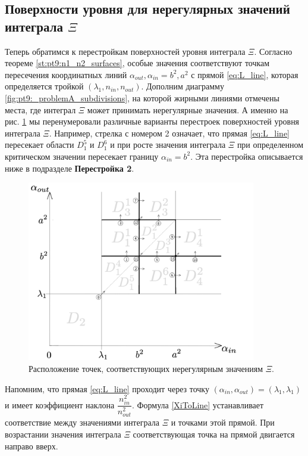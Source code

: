 \subsection{Поверхности уровня для нерегулярных значений интеграла $\Xi$}\label{sec:ch4/sec2/subsec2}
Теперь обратимся к перестройкам поверхностей уровня интеграла $\Xi$. 
Согласно теореме \ref{st:pt9:n1_n2_surfaces}, особые значения соответствуют точкам пересечения координатных линий $\alpha_{out}, \alpha_{in} = b^2, a^2$ с прямой \eqref{eq:L_line}, которая определяется тройкой $(\lambda_1, n_{in}, n_{out})$.
Дополним диаграмму  \ref{fig:pt9:_problemA_subdivisions}, на которой жирными линиями отмечены места, где интеграл $\Xi$ может принимать нерегулярные значения. А именно на рис. \ref{fig:pt9:_diagramPlusIrregular} мы перенумеровали различные варианты перестроек поверхностей уровня интеграла $\Xi$. 
Например, стрелка с номером 2 означает, что прямая \eqref{eq:L_line} пересекает области $D_1^5$ и $D_1^6$ и при росте значения интеграла $\Xi$ при определенном критическом значении пересекает границу $\alpha_{in} = b^2$. Эта перестройка описывается ниже в подразделе \textbf{Перестройка 2}.

\begin{figure}[!htb]
\centering
\includegraphics[width=10cm]{images/ch4/section2/diagramPlusIrregular.pdf}
    \caption{Расположение точек, соответствующих нерегулярным значениям $\Xi$.}
    \label{fig:pt9:_diagramPlusIrregular}
\end{figure}

Напомним, что прямая  \eqref{eq:L_line} проходит через точку $(\alpha_{in}, \alpha_{out}) = (\lambda_1, \lambda_1)$ и имеет коэффициент наклона $\dfrac{n_{in}^2}{n_{out}^2}$. Формула \eqref{XiToLine} устанавливает соответствие между значениями интеграла $\Xi$ и точками этой прямой. При возрастании значения интеграла $\Xi$ соответствующая точка на прямой двигается направо вверх. 

